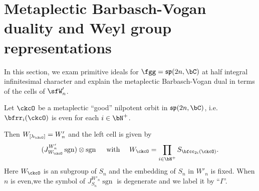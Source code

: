 \documentclass[12pt,a4paper]{amsart}
\newcommand{\trivial}[2][]{\if\relax\detokenize{#1}\relax
  {%
      \color{orange} \vspace{0em} $[$  #2 $]$
      \color{black}
  }
  \else
\ifx#1h
\ifcsname showtrivial\endcsname
{%
    \color{orange} \vspace{0em}  $[$ #2 $]$
    \color{black}
}
\fi
\else {\red Wrong argument!} \fi
\fi
}
\def\fsp{\mathfrak{sp}}
\DeclareMathOperator{\ind}{ind}
\newcommand{\sgn}{\operatorname{sgn}}
\numberwithin{equation}{section}
\theoremstyle{remark}
\begin{document}







\section{Metaplectic Barbasch-Vogan duality and Weyl group representations}

In this section, we exam primitive ideals for $\fgg=\fsp(2n,\bC)$ at half
integral infinitesimal character and explain the metaplectic Barbasch-Vogan dual
in terms of the cells of $\sfW'_{n}$.

Let $\ckcO$ be a metaplectic ``good'' nilpotent orbit in $\fsp(2n,\bC)$, i.e.
$\bfrr_i(\ckcO)$ is even for each $i\in \bN^+$.

Then $W_{[\lambda_{\ckcO}]} = W'_n$ and the left cell is given by
\[
(J_{W_\ckcO}^{W'_n} \sgn) \otimes \sgn \quad \text{ with } \quad W_\ckcO = \prod_{i\in \bN^+} S_{\bfcc_{2i}(\ckcO)}.
\]
Here $W_\ckcO$ is an subgroup of $S_n$ and the embedding of $S_n$ in $W'_n$ is fixed.
When $n$ is even,we the symbol of $J_{S_n}^{W'_n} \sgn$ is degenerate and we label it by ``$I$''.
\end{document}
